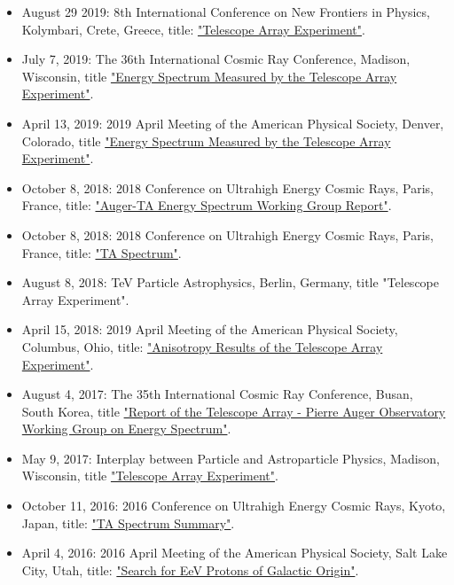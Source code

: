 \documentclass[12pt,letterpaper]{article} %
\begin{document}
{
	\begin{itemize}
		\item August  29  2019: 8th International Conference on New Frontiers in Physics, Kolymbari, Crete, Greece, title: \href{https://indico.cern.ch/event/754973/contributions/3539439/}{"Telescope Array Experiment"}.
		\item July    7,  2019: The 36th International Cosmic Ray Conference, Madison, Wisconsin, title \href{http://meetings.aps.org/Meeting/APR19/Session/G08.2}{"Energy Spectrum Measured by the Telescope Array Experiment"}.
		\item April   13, 2019: 2019 April Meeting of the American Physical Society, Denver, Colorado, title \href{https://www.icrc2019.org/uploads/1/1/9/0/119067782/ivanov_icrc2019_ta_spectrum.pdf}{"Energy Spectrum Measured by the Telescope Array Experiment"}.
		\item October 8,  2018: 2018 Conference on Ultrahigh Energy Cosmic Rays, Paris, France, title: \href{https://indico.in2p3.fr/event/17063/contributions/64364/}{"Auger-TA Energy Spectrum Working Group Report"}.
		\item October 8,  2018: 2018 Conference on Ultrahigh Energy Cosmic Rays, Paris, France, title: \href{https://indico.in2p3.fr/event/17063/contributions/64389/}{"TA Spectrum"}.
		\item August  8,  2018: TeV Particle Astrophysics, Berlin, Germany, title "Telescope Array Experiment".
		\item April   15, 2018: 2019 April Meeting of the American Physical Society, Columbus, Ohio, title: \href{https://meetings.aps.org/Meeting/APR18/Event/326162}{"Anisotropy Results of the Telescope Array Experiment"}.
		\item August  4,  2017: The 35th International Cosmic Ray Conference, Busan, South Korea, 
								title \href{https://pos.sissa.it/301/498/pdf}{"Report of the Telescope Array - Pierre Auger Observatory Working Group on Energy Spectrum"}.
		\item May     9,  2017: Interplay between Particle and Astroparticle Physics, Madison, Wisconsin, title \href{https://events.icecube.wisc.edu/event/82/contributions/5218/}{"Telescope Array Experiment"}.
		\item October 11, 2016: 2016 Conference on Ultrahigh Energy Cosmic Rays, Kyoto, Japan, title: \href{https://indico.cern.ch/event/504078/contributions/2305993/}{"TA Spectrum Summary"}.
		\item April    4, 2016: 2016 April Meeting of the American Physical Society, Salt Lake City, Utah, title: \href{http://meetings.aps.org/Meeting/APR16/Session/R11.6}{"Search for EeV Protons of Galactic Origin"}.

\end{itemize}}
\end{document}
